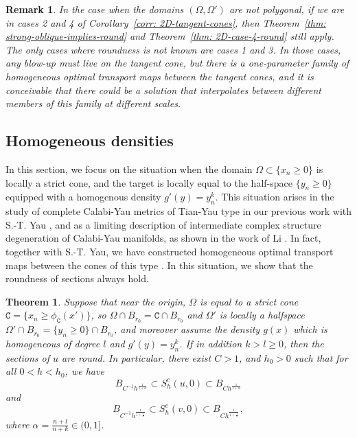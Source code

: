 \documentclass[12pt,reqno]{amsart}
\newtheorem{remark}{Remark}[section]
\newtheorem{theorem}{Theorem}[section]
\numberwithin{equation}{section}
\begin{document}
        \begin{remark}
            In the case when the domains $(\Omega, \Omega')$ are not polygonal, if we are in cases 2 and 4 of Corollary~\ref{corr: 2D-tangent-cones}, then Theorem~\ref{thm: strong-oblique-implies-round} and Theorem~\ref{thm: 2D-case-4-round} still apply. The only cases where roundness is not known are cases 1 and 3. In those cases, any blow-up must live on the tangent cone, but there is a one-parameter family of homogeneous optimal transport maps between the tangent cones, and it is conceivable that there could be a solution that interpolates between different members of this family at different scales. 
        \end{remark}
	\subsection{Homogeneous densities}
        In this section, we focus on the situation when the domain $\Omega\subset \{x_n\geq 0\}$ is locally a strict cone, and the target is locally equal to the half-space $\{y_n\geq 0\}$ equipped with a homogenous density $g'(y) = y_n^k$. This situation arises in the study of complete Calabi-Yau metrics of Tian-Yau type in our previous work with S.-T. Yau \cite{Collins-Tong-Yau}, and as a limiting description of intermediate complex structure degeneration of Calabi-Yau manifolds, as shown in the work of Li \cite{Li-intermediate}. In fact, together with S.-T. Yau, we have constructed homogeneous optimal transport maps between the cones of this type \cite[Corollary 1.1]{Collins-Tong-Yau}. In this situation, we show that the roundness of sections always hold. 
        \begin{theorem}\label{thm: round-degenerate-density}
            Suppose that near the origin, $\Omega$ is equal to a strict cone $\mathtt C = \{x_n\geq \phi_{\mathtt C}(x')\}$, so $\Omega\cap B_{r_0} =\mathtt C\cap B_{r_0}$ and $\Omega'$ is locally a halfspace $\Omega'\cap B_{r_0} = \{y_n\geq 0\}\cap B_{r_0}$, and moreover assume the density $g(x)$ which is homogeneous of degree $l$ and $g'(y) = y_n^k$. If in addition $k> l\geq 0$, then the sections of $u$ are round. In particular, there exist $C>1$, and $h_0>0$ such that for all $0<h<h_0$, we have
            \[B_{C^{-1}h^{\frac{1}{1+\alpha}}} \subset S^c_h(u, 0)\subset B_{Ch^{\frac{1}{1+\alpha}}}\]
            and 
            \[B_{C^{-1}h^{\frac{1}{1+\frac{1}{\alpha}}}}\subset S_h^c(v, 0)\subset B_{Ch^{\frac{1}{1+\frac{1}{\alpha}}}},\]
            where $\alpha = \frac{n+l}{n+k}\in (0, 1]$. 
        \end{theorem}
\end{document}
